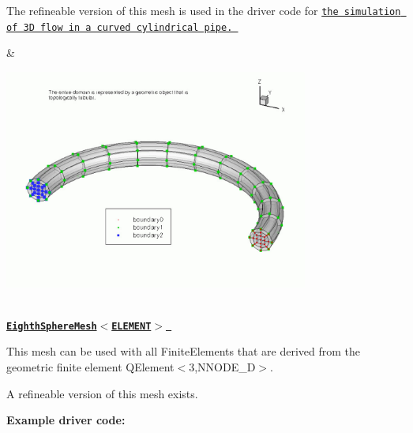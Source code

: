 \begin{center}
\begin{longtabu}
\begin{DoxyItemize}
\item The refineable version of this mesh is used in the driver code for \href{../../../navier_stokes/curved_pipe/html/index.html}{\tt the simulation of 3D flow in a curved cylindrical pipe. }
\end{DoxyItemize}& 
\begin{DoxyImageNoCaption}
  \mbox{\includegraphics[width=0.75\textwidth]{tube_mesh}}
\end{DoxyImageNoCaption}
   \\
\href{classoomph_1_1EighthSphereMesh.html}{\tt {\bfseries  Eighth\+Sphere\+Mesh$<$\+E\+L\+E\+M\+E\+N\+T$>$ }} ~\newline
~\newline

\begin{DoxyItemize}
\item This mesh can be used with all {\ttfamily Finite\+Elements} that are derived from the geometric finite element {\ttfamily Q\+Element$<$3,\+N\+N\+O\+D\+E\+\_\+D$>$}.
\item A refineable version of this mesh exists.
\end{DoxyItemize}{\bfseries Example driver code\+:} ~\newline


\end{longtabu}
\end{center}
